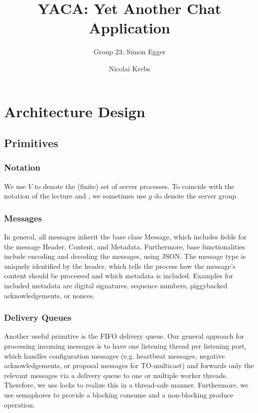 \documentclass[runningheads]{llncs}
\begin{document}
%
\title{YACA: Yet Another Chat Application}

\author{Group 23: Simon Egger \and Nicolai Krebs}

\institute{}
%
\maketitle              %


\section{Architecture Design}

\subsection{Primitives}

\subsubsection{Notation} We use $V$ to denote the (finite) set of server processes. To coincide with the notation of the lecture and \cite{ds_book}, we sometimes use $g$ do denote the server group.

\subsubsection{Messages}
In general, all messages inherit the base class \textsf{Message}, which includes fields for the message \textsf{Header}, \textsf{Content}, and \textsf{Metadata}. Furthermore, base functionalities include encoding and decoding the messages, using JSON. The message type is uniquely identified by the header, which tells the process how the message's content should be processed and which metadata is included. Examples for included metadata are digital signatures, sequence numbers, piggybacked acknowledgements, or nonces.

\subsubsection{Delivery Queues}
Another useful primitive is the FIFO delivery queue. Our general approach for processing incoming messages is to have one listening thread per listening port, which handles configuration messages (e.g. heartbeat messages, negative acknowledgements, or proposal messages for TO-multicast) and forwards only the relevant messages via a delivery queue to one or multiple worker threads. Therefore, we use locks to realize this in a thread-safe manner. Furthermore, we use semaphores to provide a blocking consume and a non-blocking produce operation. 
\end{document}
